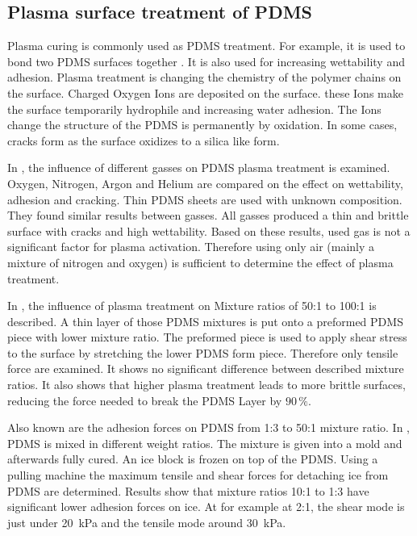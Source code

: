 \subsection{Plasma surface treatment of PDMS}

Plasma curing is commonly used as PDMS treatment. For example, it is used to bond two PDMS surfaces together \cite{Borok.2021}. It is also used for increasing wettability and adhesion. Plasma treatment is changing the chemistry of the polymer chains on the surface. Charged Oxygen Ions are deposited on the surface. these Ions make the surface temporarily hydrophile and increasing water adhesion. The Ions change the structure of the PDMS is permanently by oxidation. In some cases, cracks form as the surface oxidizes to a silica like form.

In \cite{Owen.1994}, the influence of different gasses on PDMS plasma treatment is examined. Oxygen, Nitrogen, Argon and Helium are compared on the effect on wettability, adhesion and cracking. Thin PDMS sheets are used with unknown composition. They found similar results between gasses. All gasses produced a thin and brittle surface with cracks and high wettability. Based on these results, used gas is not a significant factor for plasma activation. Therefore using only air (mainly a mixture of nitrogen and oxygen) is sufficient to determine the effect of plasma treatment.


In \cite{Ohishi.2017}, the influence of plasma treatment on Mixture ratios of 50:1 to 100:1 is described. A thin layer of those PDMS mixtures is put onto a preformed PDMS piece with lower mixture ratio. The preformed piece is used to apply shear stress to the surface by stretching the lower PDMS form piece. Therefore only tensile force are examined. It shows no significant difference between described mixture ratios. It also shows that higher plasma treatment leads to more brittle surfaces, reducing the force needed to break the PDMS Layer by $90\,\%$.

Also known are the adhesion forces on PDMS from 1:3 to 50:1 mixture ratio. In \cite{IbanezIbanez.2022}, PDMS is mixed in different weight ratios. The mixture is given into a mold and afterwards fully cured. An ice block is frozen on top of the PDMS. Using a pulling machine the maximum tensile and shear forces for detaching ice from PDMS are determined. Results show that mixture ratios 10:1 to 1:3 have significant lower adhesion forces on ice. At for example at 2:1, the shear mode is just under \SI{20}{\kilo\pascal} and the tensile mode around \SI{30}{\kilo\pascal}. 

